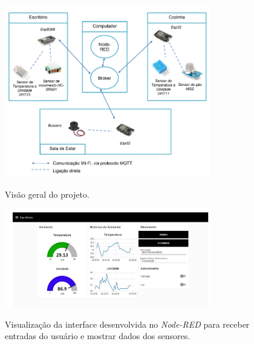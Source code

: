 \begin{figure}[H]
	\centering
	\caption{Visão geral do projeto.}
	\includegraphics[width=0.8\textwidth]{figuras/trabalhos_relacionados/fig04.png}
	\label{fig:trab_rel_04}
\end{figure}

\begin{figure}[H]
	\centering
	\caption{Visualização da interface desenvolvida no \textit{Node-RED} para receber entradas do usuário e mostrar dados dos sensores.}
	\includegraphics[width=0.8\textwidth]{figuras/trabalhos_relacionados/fig05.png}
	\label{fig:trab_rel_05}
\end{figure}

